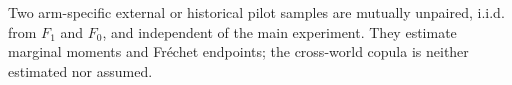 Two arm-specific external or historical pilot samples are mutually unpaired, i.i.d. from \(F_1\) and \(F_0\), and independent of the main experiment.  They estimate marginal moments and Fr\'echet endpoints; the cross-world copula is neither estimated nor assumed.